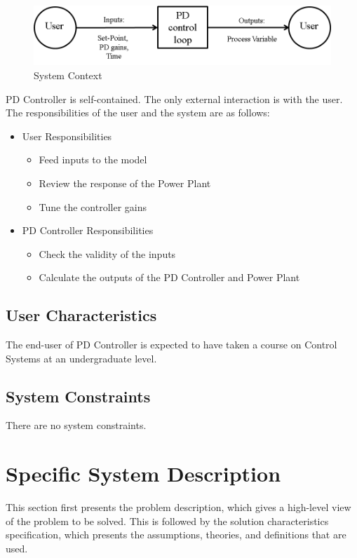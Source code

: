 \documentclass[12pt]{article}
\begin{document}
\begin{figure}[H]
\begin{center}
\includegraphics[width=\textwidth]{../../../../datafiles/pdcontroller/Fig_SystemContext.png}
\caption{System Context}
\label{Figure:systemContextDiag}
\end{center}
\end{figure}
PD Controller is self-contained. The only external interaction is with the user. The responsibilities of the user and the system are as follows:

\begin{itemize}
\item{User Responsibilities}
\begin{itemize}
\item{Feed inputs to the model}
\item{Review the response of the Power Plant}
\item{Tune the controller gains}
\end{itemize}
\item{PD Controller Responsibilities}
\begin{itemize}
\item{Check the validity of the inputs}
\item{Calculate the outputs of the PD Controller and Power Plant}
\end{itemize}
\end{itemize}
\subsection{User Characteristics}
\label{Sec:UserChars}
The end-user of PD Controller is expected to have taken a course on Control Systems at an undergraduate level.

\subsection{System Constraints}
\label{Sec:SysConstraints}
There are no system constraints.

\section{Specific System Description}
\label{Sec:SpecSystDesc}
This section first presents the problem description, which gives a high-level view of the problem to be solved. This is followed by the solution characteristics specification, which presents the assumptions, theories, and definitions that are used.
\end{document}
